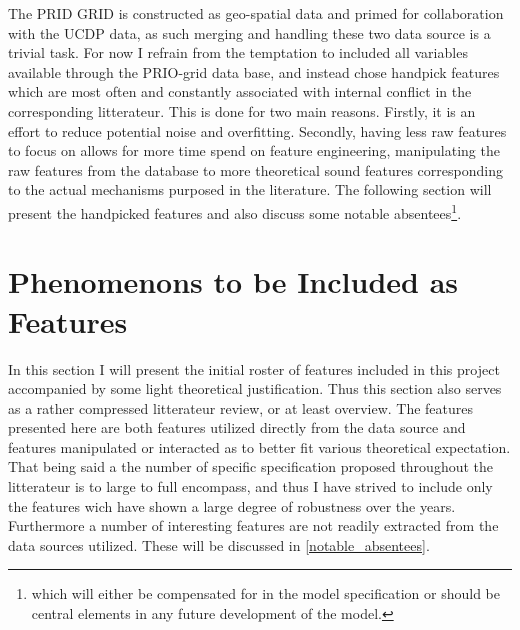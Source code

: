 \documentclass[a4paper]{article}
\begin{document}
The PRID GRID is constructed as geo-spatial data and primed for collaboration with the UCDP data, as such merging and handling these two data source is a trivial task. For now I refrain from the temptation to included all variables available through the PRIO-grid data base, and instead chose handpick features which are most often and constantly associated with internal conflict in the corresponding litterateur. This is done for two main reasons. Firstly, it is an effort to reduce potential noise and overfitting. Secondly, having less raw features to focus on allows for more time spend on feature engineering, manipulating the raw features from the database to more theoretical sound features corresponding to the actual mechanisms purposed in the literature. The following section will present the handpicked features and also discuss some notable absentees\footnote{which will either be compensated for in the model specification or should be central elements in any future development of the model.}.\par

\section{Phenomenons to be Included as Features}


In this section I will present the initial roster of features included in this project accompanied by some light theoretical justification. Thus this section also serves as a rather compressed litterateur review, or at least overview. The features presented here are both features utilized directly from the data source and features manipulated or interacted as to better fit various theoretical expectation. That being said a the number of specific specification proposed throughout the litterateur is to large to full encompass, and thus I have strived to include only the features wich have shown a large degree of robustness over the years. Furthermore a number of interesting features are not readily extracted from the data sources utilized. These will be discussed in \autoref{notable_absentees}.

\end{document}
